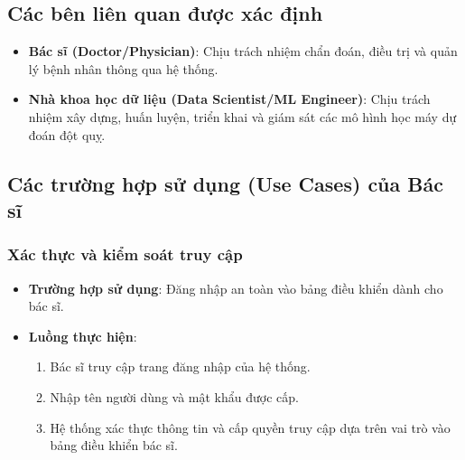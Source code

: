 ﻿\documentclass{article}
\begin{document}
\subsection{Các bên liên quan được xác định}
\begin{itemize}
    \item \textbf{Bác sĩ (Doctor/Physician)}: Chịu trách nhiệm chẩn đoán, điều trị và quản lý bệnh nhân thông qua hệ thống.
    \item \textbf{Nhà khoa học dữ liệu (Data Scientist/ML Engineer)}: Chịu trách nhiệm xây dựng, huấn luyện, triển khai và giám sát các mô hình học máy dự đoán đột quỵ.
\end{itemize}

\subsection{Các trường hợp sử dụng (Use Cases) của Bác sĩ}
\subsubsection{Xác thực và kiểm soát truy cập}
\begin{itemize}
    \item \textbf{Trường hợp sử dụng}: Đăng nhập an toàn vào bảng điều khiển dành cho bác sĩ.
    \item \textbf{Luồng thực hiện}:
        \begin{enumerate}
            \item Bác sĩ truy cập trang đăng nhập của hệ thống.
            \item Nhập tên người dùng và mật khẩu được cấp.
            \item Hệ thống xác thực thông tin và cấp quyền truy cập dựa trên vai trò vào bảng điều khiển bác sĩ.
        \end{enumerate}
\end{itemize}
\end{document}
